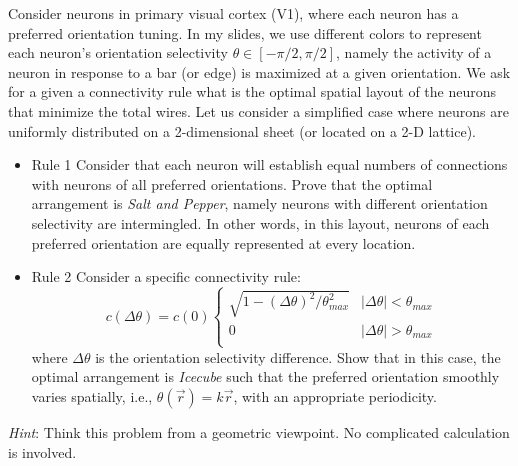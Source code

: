 \documentclass{article}
\newcommand{\abs}[1]{\lvert #1 \rvert}
\begin{document}
Consider neurons in primary visual cortex (V1), where each neuron has a preferred orientation tuning. In my slides, we use different colors to represent each neuron's orientation selectivity $\theta \in [-\pi/2, \pi/2]$, namely the activity of a neuron in response to a bar (or edge) is maximized at a given orientation. We ask for a given a connectivity rule what is the optimal spatial layout of the neurons that minimize the total wires. Let us consider a simplified case where neurons are uniformly distributed on a 2-dimensional sheet (or located on a 2-D lattice). 
\begin{itemize}
\item {Rule 1} Consider that each neuron will establish equal numbers of connections with neurons of all preferred orientations. Prove that the optimal arrangement is \emph{Salt and Pepper}, namely neurons with different orientation selectivity are intermingled. In other words, in this layout, neurons of each preferred orientation are equally represented at every location. 
\item{Rule 2} Consider a specific connectivity rule:
\[
c(\Delta\theta) = c(0) 
\begin{cases} 
\sqrt{1- (\Delta\theta)^2/\theta_{max}^2} & \abs{\Delta \theta} < \theta_{max} \\
0 & \abs{\Delta \theta} > \theta_{max} \\
\end{cases}
\]
where $\Delta\theta$ is the orientation selectivity difference.  Show that in this case, the optimal arrangement is \emph{Icecube} such that the preferred orientation smoothly varies spatially, i.e., $\theta(\vec{r}) = k\vec{r}$, with an appropriate periodicity. 
\end{itemize}
\emph{Hint}: Think this problem from a geometric viewpoint. No complicated calculation is involved.
\end{document}
